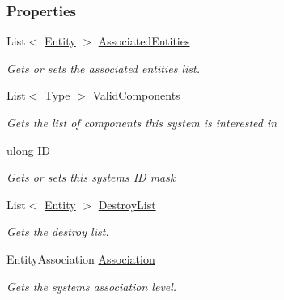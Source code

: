 \subsubsection*{Properties}
\begin{DoxyCompactItemize}
\item 
List$<$ \hyperlink{class_m_b2_d_1_1_entity_component_1_1_entity}{Entity} $>$ \hyperlink{class_m_b2_d_1_1_entity_component_1_1_entity_system_a1c442059af272594b0485832c9f44e94}{Associated\+Entities}
\begin{DoxyCompactList}\small\item\em Gets or sets the associated entities list. \end{DoxyCompactList}\item 
List$<$ Type $>$ \hyperlink{class_m_b2_d_1_1_entity_component_1_1_entity_system_ad78a75cc9b9bd5a4250ea725dbde3300}{Valid\+Components}
\begin{DoxyCompactList}\small\item\em Gets the list of components this system is interested in \end{DoxyCompactList}\item 
ulong \hyperlink{class_m_b2_d_1_1_entity_component_1_1_entity_system_a33c31c8fda2901b2bebd71caf39c0d23}{ID}
\begin{DoxyCompactList}\small\item\em Gets or sets this systems ID mask \end{DoxyCompactList}\item 
List$<$ \hyperlink{class_m_b2_d_1_1_entity_component_1_1_entity}{Entity} $>$ \hyperlink{class_m_b2_d_1_1_entity_component_1_1_entity_system_a9da3b207e098aa5fcc6ceb2aa3d247d8}{Destroy\+List}
\begin{DoxyCompactList}\small\item\em Gets the destroy list. \end{DoxyCompactList}\item 
Entity\+Association \hyperlink{class_m_b2_d_1_1_entity_component_1_1_entity_system_af68858392489a7aab3c91122ab48865f}{Association}
\begin{DoxyCompactList}\small\item\em Gets the systems association level. \end{DoxyCompactList}\end{DoxyCompactItemize}


